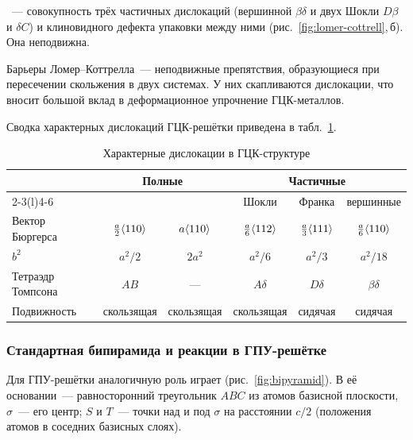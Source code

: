\begin{opredelenie}
~— совокупность трёх частичных
дислокаций (вершинной $\beta\delta$ и двух Шокли $D\beta$ и $\delta C$) и
клиновидного дефекта упаковки между ними (рис.~\ref{fig:lomer-cottrell},\,б).
Она неподвижна.
\end{opredelenie}

\begin{glavnoe}
Барьеры Ломер--Коттрелла~— неподвижные препятствия, образующиеся при
пересечении скольжения в двух системах. У них скапливаются дислокации,
что вносит большой вклад в деформационное упрочнение ГЦК-металлов.
\end{glavnoe}

Сводка характерных дислокаций ГЦК-решётки приведена в
табл.~\ref{tab:fcc-disl}.

\begin{table}[ht]
\centering
\caption{Характерные дислокации в ГЦК-структуре}
\label{tab:fcc-disl}
\small
\begin{tabular}{@{}lccccc@{}}
\toprule
 & \multicolumn{2}{c}{Полные} & \multicolumn{3}{c}{Частичные} \\
\cmidrule(lr){2-3}\cmidrule(l){4-6}
 & & & Шокли & Франка & вершинные \\
\midrule
Вектор Бюргерса & $\frac a2\langle 110\rangle$ & $a\langle 110\rangle$ & $\frac a6\langle 112\rangle$ & $\frac a3\langle 111\rangle$ & $\frac a6\langle 110\rangle$ \\[2pt]
$b^2$ & $a^2/2$ & $2a^2$ & $a^2/6$ & $a^2/3$ & $a^2/18$ \\
Тетраэдр Томпсона & $AB$ & --- & $A\delta$ & $D\delta$ & $\beta\delta$ \\
Подвижность & скользящая & скользящая & скользящая & сидячая & сидячая \\
\bottomrule
\end{tabular}
\end{table}

\subsubsection{Стандартная бипирамида и реакции в ГПУ-решётке}

Для ГПУ-решётки аналогичную роль играет 
(рис.~\ref{fig:bipyramid}). В её основании~— равносторонний треугольник
$ABC$ из атомов базисной плоскости, $\sigma$~— его центр; $S$ и $T$~—
точки над и под $\sigma$ на расстоянии $c/2$ (положения атомов в соседних
базисных слоях).

